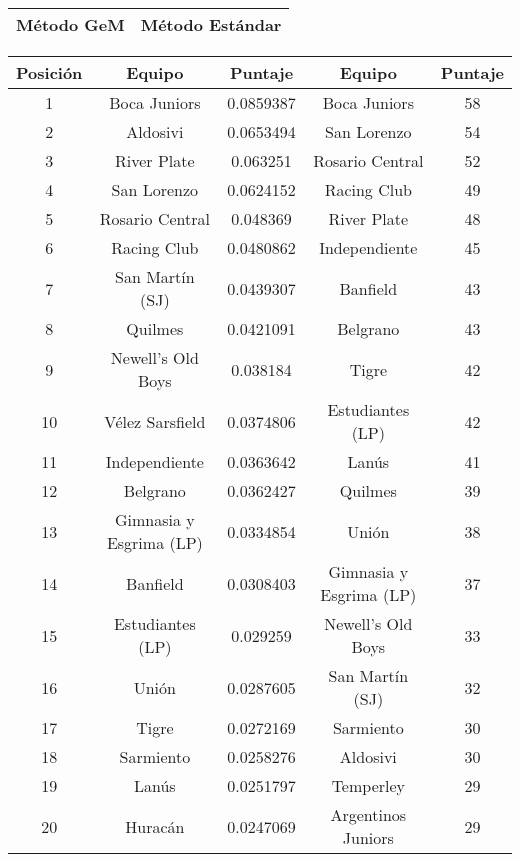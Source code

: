 \begin{table}[H]
	\center
	\begin{flushright}
	\begin{tabular}{| m{} || m{} |}
		\rowcolor{LightCyan}
		\hline Método GeM & Método Estándar \\ \hline
	\end{tabular}

	\begin{tabular}{| c | c | c || c | c |}
	  	\hline
	  	\rowcolor{LightCyan}
	  	Posición & Equipo & Puntaje & Equipo & Puntaje \\ \hline \hline
		1 & Boca Juniors & 0.0859387 & Boca Juniors & 58 \\ \hline
		2 & \cellcolor{green!20} Aldosivi & 0.0653494 & San Lorenzo & 54 \\ \hline
		3 & River Plate & 0.063251  & Rosario Central & 52\\ \hline
		4 & San Lorenzo & 0.0624152 & Racing Club & 49\\ \hline
		5 & Rosario Central & 0.048369 & River Plate & 48\\ \hline
		6 & Racing Club & 0.0480862 & Independiente & 45\\ \hline
		7 & San Martín (SJ) & 0.0439307 & Banfield & 43\\ \hline
		8 & Quilmes & 0.0421091 & Belgrano & 43\\ \hline
		9 & Newell's Old Boys & 0.038184 & Tigre & 42\\ \hline
		10 & Vélez Sarsfield & 0.0374806 & Estudiantes (LP) & 42\\ \hline
		11 & Independiente & 0.0363642 & Lanús & 41\\ \hline
		12 & Belgrano & 0.0362427 & Quilmes & 39\\ \hline
		13 & Gimnasia y Esgrima (LP) & 0.0334854 & Unión & 38\\ \hline
		14 & Banfield & 0.0308403 & Gimnasia y Esgrima (LP) & 37\\ \hline
		15 & Estudiantes (LP) & 0.029259 & Newell's Old Boys & 33\\ \hline
		16 & Unión & 0.0287605 & San Martín (SJ) & 32\\ \hline
		17 & Tigre & 0.0272169 & Sarmiento & 30\\ \hline
		18 & Sarmiento & 0.0258276 & \cellcolor{green!20} Aldosivi & 30\\ \hline
		19 & Lanús & 0.0251797 & Temperley & 29\\ \hline
		20 & Huracán & 0.0247069 & Argentinos Juniors & 29\\ \hline

\end{tabular}
\end{flushright}
\end{table}
